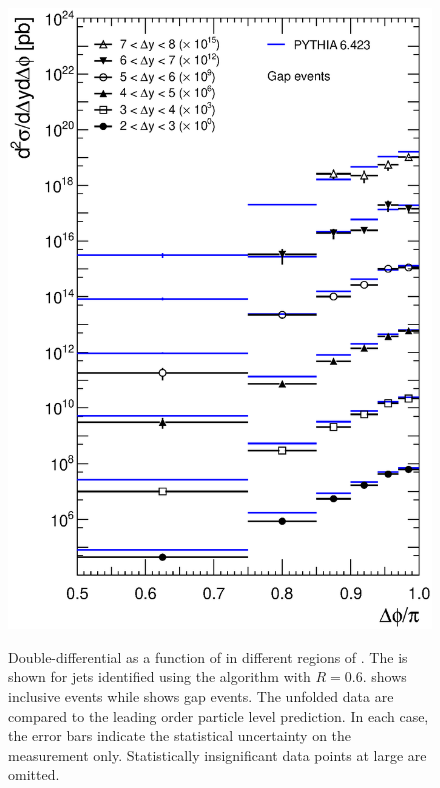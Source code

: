 \begin{figure}[htpb]
{    \includegraphics[width=\smallfigwidth]{chapters/azimuthal-decorrelation/Gap.CrossSection.all_dY_slices.dPhiBins.eps}
    \label{fig:azimuthal-decorrelation:cross-section_DeltaPhi_gap}}
  \caption{Double-differential \xs as a function of \DeltaPhi in different regions of \DeltaY.
           The \xs is shown for jets identified using the \akt algorithm with
           $R=0.6$. \protect{}
           shows inclusive events while \protect{}
           shows gap events. The unfolded data are compared to the leading order particle
           level  prediction. In each case, the error bars
           indicate the statistical uncertainty on the measurement only. Statistically
           insignificant data points at large \DeltaY are omitted.}
  \label{fig:azimuthal-decorrelation:cross-sections_dPhi}
\end{figure}

